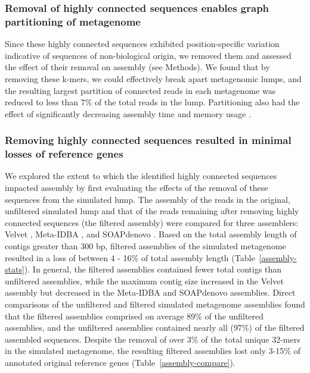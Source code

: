 \documentclass[10pt]{article}
\begin{document}
\subsubsection*{Removal of highly connected sequences enables graph partitioning of metagenome}

Since these highly connected sequences exhibited position-specific
variation indicative of sequences of non-biological origin, we removed
them and assessed the effect of their removal on assembly (see
Methods).  We found that by removing these k-mers, we could
effectively break apart metagenomic lumps, and the resulting largest
partition of connected reads in each metagenome was reduced to less
than 7\% of the total reads in the lump.  Partitioning also had the
effect of significantly decreasing assembly time and memory usage
\cite{Pell:2012cq}.

\subsubsection*{Removing highly connected sequences resulted in minimal losses of reference genes}

We explored the extent
to which the identified highly connected
sequences impacted assembly by first evaluating the effects of the
removal of these sequences from the simulated lump.  The assembly of the reads in the original,
unfiltered simulated lump and that of the reads remaining after
removing highly connected sequences (the filtered assembly) were
compared for three assemblers: Velvet \cite{Zerbino:2008p665}, Meta-IDBA \cite{Peng:2011p898}, and SOAPdenovo \cite{Li:2010p234}.
Based on the total assembly length of contigs greater than 300 bp,
filtered assemblies of the simulated metagenome resulted in a loss of
between 4 - 16\% of total assembly length (Table~\ref{assembly-stats}).  In general, the
filtered assemblies contained fewer total contigs than unfiltered
assemblies, while the maximum contig size increased in the Velvet
assembly but decreased in the Meta-IDBA and SOAPdenovo assemblies.
Direct comparisons of the unfiltered and filtered simulated metagenome assemblies found
that the filtered assemblies comprised on average 89\% of the
unfiltered assemblies, and the unfiltered assemblies contained nearly
all (97\%) of the filtered assembled sequences.  Despite the removal
of over 3\% of the total unique 32-mers in the simulated metagenome,
the resulting filtered assemblies lost only 3-15\% of annotated original reference genes (Table~\ref{assembly-compare}).
\end{document}
